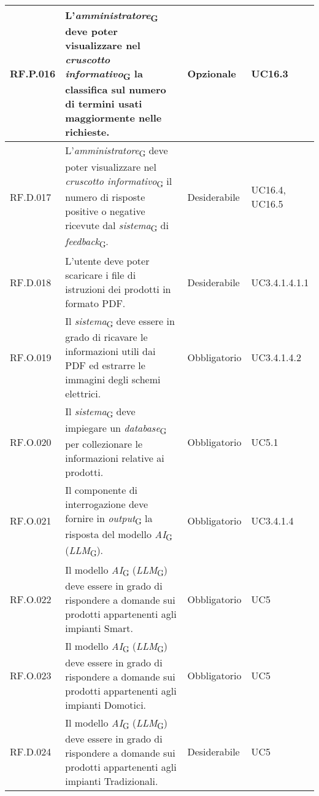 \begin{table}[H]
\centering
    \begin{tabular}{|C{2.7cm}|L{6.5cm}|C{2.7cm}|C{2.7cm}|}
        \hline
        RF.P.016 & L'\textit{amministratore}\textsubscript{G} deve poter visualizzare nel \textit{cruscotto informativo}\textsubscript{G} la classifica sul numero di termini usati maggiormente nelle richieste.
         & Opzionale & UC16.3 \\
        \hline
        RF.D.017 & L'\textit{amministratore}\textsubscript{G} deve poter visualizzare nel \textit{cruscotto informativo}\textsubscript{G} il numero di risposte positive o negative ricevute dal \textit{sistema}\textsubscript{G} di \textit{feedback}\textsubscript{G}.
         & Desiderabile & UC16.4, UC16.5 \\
        \hline
         RF.D.018 & L'utente deve poter scaricare i file di istruzioni dei prodotti in formato PDF.
         & Desiderabile & UC3.4.1.4.1.1 \\
        \hline
         RF.O.019 & Il \textit{sistema}\textsubscript{G} deve essere in grado di ricavare le informazioni utili dai PDF ed estrarre le immagini degli schemi elettrici.
         & Obbligatorio & UC3.4.1.4.2 \\
        \hline
         RF.O.020 & Il \textit{sistema}\textsubscript{G} deve impiegare un \textit{database}\textsubscript{G} per collezionare le informazioni relative ai prodotti.
         & Obbligatorio & UC5.1 \\
        \hline
        RF.O.021 & Il componente di interrogazione deve fornire in \textit{output}\textsubscript{G} la risposta del modello \textit{AI}\textsubscript{G} (\textit{LLM}\textsubscript{G}).
         & Obbligatorio & UC3.4.1.4 \\
        \hline
        RF.O.022 & Il modello \textit{AI}\textsubscript{G} (\textit{LLM}\textsubscript{G}) deve essere in grado di rispondere a domande sui prodotti appartenenti agli impianti Smart.
         & Obbligatorio & UC5 \\
        \hline
        RF.O.023 & Il modello \textit{AI}\textsubscript{G} (\textit{LLM}\textsubscript{G}) deve essere in grado di rispondere a domande sui prodotti appartenenti agli impianti Domotici.
         & Obbligatorio & UC5 \\
         \hline
        RF.D.024 & Il modello \textit{AI}\textsubscript{G} (\textit{LLM}\textsubscript{G}) deve essere in grado di rispondere a domande sui prodotti appartenenti agli impianti Tradizionali.
         & Desiderabile & UC5 \\

\end{tabular}
\end{table}
